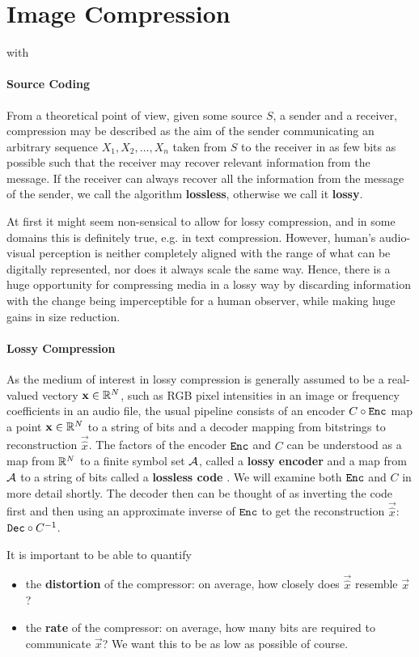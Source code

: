 \section{Image Compression}
\par
with 
\paragraph{Source Coding}
From a theoretical point of view, given some source $S$, a sender and a
receiver, compression may be described as the aim of the sender communicating an
arbitrary sequence $X_1, X_2, \hdots, X_n$ taken from $S$ to the receiver in as few bits
as possible such that the receiver may recover relevant information from the message.
If the receiver can always recover all the information from the message of the sender, we
call the algorithm \textbf{lossless}, otherwise we call it \textbf{lossy}. 
\par
At first it might seem non-sensical to allow for lossy compression, and in some
domains this is definitely true, e.g. in text compression. However, 
human's audio-visual perception is neither completely aligned with the range of
what can be digitally represented, nor does it always scale the same way. Hence,
there is a huge opportunity for compressing media in a lossy way by discarding
information with the change being imperceptible for a human observer, while
making huge gains in size reduction.
\paragraph{Lossy Compression}
As the medium of interest in lossy compression is generally assumed to be a
real-valued vectory $\mathbf{x} \in \mathbb{R}^N$, such as RGB pixel intensities in an
image or frequency coefficients in an audio file, the usual pipeline consists of 
an encoder $C \circ \mathtt{Enc}$ map a point $\mathbf{x} \in \mathbb{R}^N$ to a string of bits and a
decoder mapping from bitstrings to reconstruction $\vec{\hat{x}}$. The
factors of the encoder $\mathtt{Enc}$ and $C$ can be understood as a map from $\mathbb{R}^N$ to a
finite symbol set $\mathcal{A}$, called a \textbf{lossy encoder} and a map from $\mathcal{A}$ to a
string of bits called a \textbf{lossless code} \cite{goyal2001theoretical}.
We will examine both $\mathtt{Enc}$ and $C$ in more detail shortly. The decoder then can be
thought of as inverting the code first and then using an approximate inverse of
$\mathtt{Enc}$ to get the reconstruction $\vec{\hat{x}}$: $\mathtt{Dec} \circ C^{-1}$.
\par
It is important to be able to quantify
\begin{itemize}
\item the \textbf{distortion} of the compressor: on average, how closely does
  $\vec{\hat{x}}$ resemble $\vec{x}$?
\item the \textbf{rate} of the compressor: on average, how many bits are
  required to communicate $\vec{x}$? We want this to be as low as possible of course.
\end{itemize}

